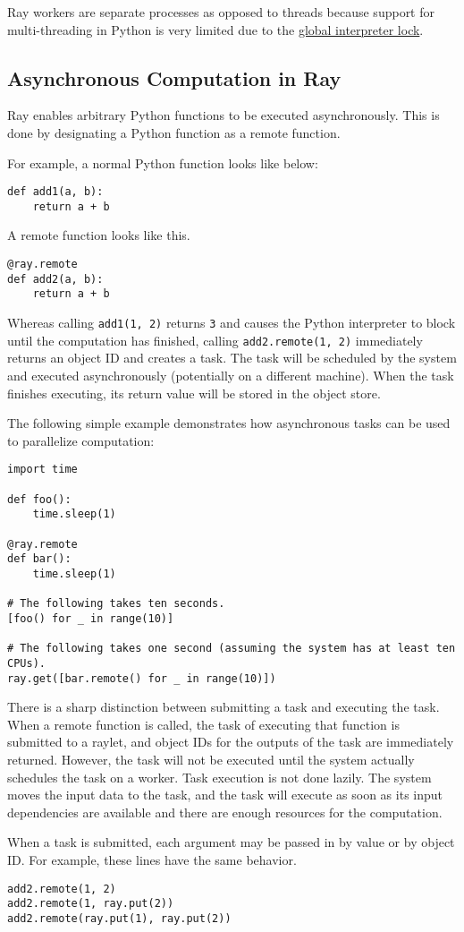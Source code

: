 Ray workers are separate processes as opposed to threads because support for multi-threading in Python is very limited due to the \href{https://wiki.python.org/moin/GlobalInterpreterLock}{global interpreter lock}.

\subsection{Asynchronous Computation in Ray}
Ray enables arbitrary Python functions to be executed asynchronously. This is done by designating a Python function as a remote function.

For example, a normal Python function looks like below:
\begin{verbatim}
def add1(a, b):
    return a + b
\end{verbatim}

A remote function looks like this.
\begin{verbatim}
@ray.remote
def add2(a, b):
    return a + b
\end{verbatim}

Whereas calling \verb|add1(1, 2)| returns \verb|3| and causes the Python interpreter to block until the computation has finished, calling \verb|add2.remote(1, 2)| immediately returns an object ID and creates a task. The task will be scheduled by the system and executed asynchronously (potentially on a different machine). When the task finishes executing, its return value will be stored in the object store.

The following simple example demonstrates how asynchronous tasks can be used to parallelize computation:

\begin{verbatim}
import time

def foo():
    time.sleep(1)

@ray.remote
def bar():
    time.sleep(1)

# The following takes ten seconds.
[foo() for _ in range(10)]

# The following takes one second (assuming the system has at least ten CPUs).
ray.get([bar.remote() for _ in range(10)])
\end{verbatim}

There is a sharp distinction between submitting a task and executing the task. When a remote function is called, the task of executing that function is submitted to a raylet, and object IDs for the outputs of the task are immediately returned. However, the task will not be executed until the system actually schedules the task on a worker. Task execution is not done lazily. The system moves the input data to the task, and the task will execute as soon as its input dependencies are available and there are enough resources for the computation.

When a task is submitted, each argument may be passed in by value or by object ID. For example, these lines have the same behavior.

\begin{verbatim}
add2.remote(1, 2)
add2.remote(1, ray.put(2))
add2.remote(ray.put(1), ray.put(2))
\end{verbatim}
